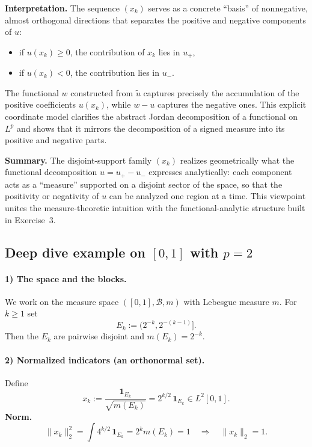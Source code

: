 \documentclass[12pt,a4paper]{article}
\theoremstyle{plain}
\theoremstyle{definition}
\theoremstyle{remark}
\theoremstyle{remark}
\theoremstyle{definition}
\begin{document}
	\bigskip
	
	\noindent
	\textbf{Interpretation.}\;
	The sequence $(x_k)$ serves as a concrete ``basis'' of nonnegative,
	almost orthogonal directions that separates the positive and negative
	components of $u$:
	\begin{itemize}
		\item if $u(x_k)\ge 0$, the contribution of $x_k$ lies in $u_{+}$,
		\item if $u(x_k)<0$, the contribution lies in $u_{-}$.
	\end{itemize}
	The functional $w$ constructed from $\tilde u$ captures precisely
	the accumulation of the positive coefficients $u(x_k)$, while $w-u$
	captures the negative ones.
	This explicit coordinate model clarifies the abstract Jordan decomposition
	of a functional on $L^{p}$ and shows that it mirrors the decomposition
	of a signed measure into its positive and negative parts.
	
	\bigskip
	
	\noindent
	\textbf{Summary.}\;
	The disjoint-support family $(x_k)$ realizes geometrically what the
	functional decomposition $u=u_{+}-u_{-}$ expresses analytically:
	each component acts as a ``measure'' supported on a disjoint sector
	of the space, so that the positivity or negativity of $u$
	can be analyzed one region at a time.
	This viewpoint unites the measure-theoretic intuition
	with the functional-analytic structure built in Exercise~3.
	
	\subsection*{Deep dive example on $[0,1]$ with $p=2$}
	
	\paragraph{1) The space and the blocks.}
	We work on the measure space $([0,1],\mathcal B,m)$ with Lebesgue measure $m$.
	For $k\ge 1$ set
	\[
	E_k := (2^{-k},2^{-(k-1)}].
	\]
	Then the $E_k$ are pairwise disjoint and $m(E_k)=2^{-k}$.
	
	\bigskip
	
	\paragraph{2) Normalized indicators (an orthonormal set).}
	Define
	\[
	x_k := \frac{\mathbf 1_{E_k}}{\sqrt{m(E_k)}}
	= 2^{k/2}\,\mathbf 1_{E_k} \in L^2[0,1].
	\]
	\textbf{Norm.}\quad
	\[
	\|x_k\|_2^2 = \int 4^{k/2}\,\mathbf 1_{E_k} 
	= 2^{k} m(E_k) = 1
	\quad \Rightarrow \quad \|x_k\|_2 = 1.
	\]
	
\end{document}

